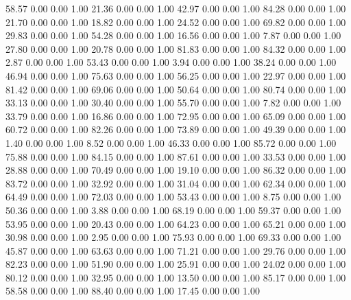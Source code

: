    58.57   0.00   0.00   1.00
   21.36   0.00   0.00   1.00
   42.97   0.00   0.00   1.00
   84.28   0.00   0.00   1.00
   21.70   0.00   0.00   1.00
   18.82   0.00   0.00   1.00
   24.52   0.00   0.00   1.00
   69.82   0.00   0.00   1.00
   29.83   0.00   0.00   1.00
   54.28   0.00   0.00   1.00
   16.56   0.00   0.00   1.00
    7.87   0.00   0.00   1.00
   27.80   0.00   0.00   1.00
   20.78   0.00   0.00   1.00
   81.83   0.00   0.00   1.00
   84.32   0.00   0.00   1.00
    2.87   0.00   0.00   1.00
   53.43   0.00   0.00   1.00
    3.94   0.00   0.00   1.00
   38.24   0.00   0.00   1.00
   46.94   0.00   0.00   1.00
   75.63   0.00   0.00   1.00
   56.25   0.00   0.00   1.00
   22.97   0.00   0.00   1.00
   81.42   0.00   0.00   1.00
   69.06   0.00   0.00   1.00
   50.64   0.00   0.00   1.00
   80.74   0.00   0.00   1.00
   33.13   0.00   0.00   1.00
   30.40   0.00   0.00   1.00
   55.70   0.00   0.00   1.00
    7.82   0.00   0.00   1.00
   33.79   0.00   0.00   1.00
   16.86   0.00   0.00   1.00
   72.95   0.00   0.00   1.00
   65.09   0.00   0.00   1.00
   60.72   0.00   0.00   1.00
   82.26   0.00   0.00   1.00
   73.89   0.00   0.00   1.00
   49.39   0.00   0.00   1.00
    1.40   0.00   0.00   1.00
    8.52   0.00   0.00   1.00
   46.33   0.00   0.00   1.00
   85.72   0.00   0.00   1.00
   75.88   0.00   0.00   1.00
   84.15   0.00   0.00   1.00
   87.61   0.00   0.00   1.00
   33.53   0.00   0.00   1.00
   28.88   0.00   0.00   1.00
   70.49   0.00   0.00   1.00
   19.10   0.00   0.00   1.00
   86.32   0.00   0.00   1.00
   83.72   0.00   0.00   1.00
   32.92   0.00   0.00   1.00
   31.04   0.00   0.00   1.00
   62.34   0.00   0.00   1.00
   64.49   0.00   0.00   1.00
   72.03   0.00   0.00   1.00
   53.43   0.00   0.00   1.00
    8.75   0.00   0.00   1.00
   50.36   0.00   0.00   1.00
    3.88   0.00   0.00   1.00
   68.19   0.00   0.00   1.00
   59.37   0.00   0.00   1.00
   53.95   0.00   0.00   1.00
   20.43   0.00   0.00   1.00
   64.23   0.00   0.00   1.00
   65.21   0.00   0.00   1.00
   30.98   0.00   0.00   1.00
    2.95   0.00   0.00   1.00
   75.93   0.00   0.00   1.00
   69.33   0.00   0.00   1.00
   45.87   0.00   0.00   1.00
   63.63   0.00   0.00   1.00
   71.21   0.00   0.00   1.00
   29.76   0.00   0.00   1.00
   82.23   0.00   0.00   1.00
   51.90   0.00   0.00   1.00
   25.91   0.00   0.00   1.00
   24.02   0.00   0.00   1.00
   80.12   0.00   0.00   1.00
   32.95   0.00   0.00   1.00
   13.50   0.00   0.00   1.00
   85.17   0.00   0.00   1.00
   58.58   0.00   0.00   1.00
   88.40   0.00   0.00   1.00
   17.45   0.00   0.00   1.00
